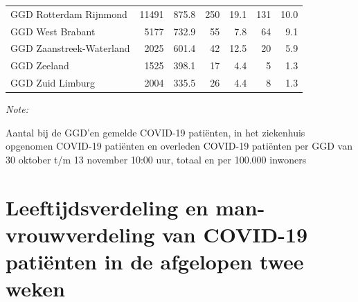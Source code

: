 \documentclass[
  english,
  man,floatsintext]{apa6}
\begin{document}
\begin{table}[H]
\begin{threeparttable}
\begin{tabular}{lrrrrrr}
GGD Rotterdam Rijnmond & 11491 & 875.8 & 250 & 19.1 & 131 & 10.0\\
GGD West Brabant & 5177 & 732.9 & 55 & 7.8 & 64 & 9.1\\
GGD Zaanstreek-Waterland & 2025 & 601.4 & 42 & 12.5 & 20 & 5.9\\
GGD Zeeland & 1525 & 398.1 & 17 & 4.4 & 5 & 1.3\\
GGD Zuid Limburg & 2004 & 335.5 & 26 & 4.4 & 8 & 1.3\\
\bottomrule
\end{tabular}
\begin{tablenotes}
\item \textit{Note: } 
\item Aantal bij de GGD’en gemelde COVID-19 patiënten, in het ziekenhuis opgenomen COVID-19 patiënten en overleden COVID-19 patiënten per GGD van 30 oktober t/m 13 november 10:00 uur, totaal en per 100.000 inwoners
\end{tablenotes}
\end{threeparttable}
\endgroup{}
\end{table}

\newpage

\hypertarget{leeftijdsverdeling-en-man-vrouwverdeling-van-covid-19-patiuxebnten-in-de-afgelopen-twee-weken}{%
\section{Leeftijdsverdeling en man-vrouwverdeling van COVID-19 patiënten in de afgelopen twee weken}\label{leeftijdsverdeling-en-man-vrouwverdeling-van-covid-19-patiuxebnten-in-de-afgelopen-twee-weken}}
\end{document}
